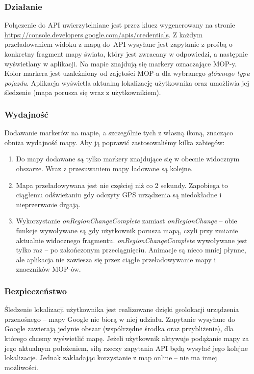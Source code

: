 \subsubsection{Działanie}
Połączenie do API uwierzytelniane jest przez klucz wygenerowany na stronie \url{https://console.developers.google.com/apis/credentials}. Z każdym przeładowaniem widoku z mapą do~API wysyłane jest zapytanie z prośbą o konkretny fragment mapy świata, który jest zwracany w odpowiedzi, a następnie wyświetlany w aplikacji. Na mapie znajdują się markery oznaczające MOP-y. Kolor markera jest uzależniony od zajętości MOP-a dla wybranego \textit{głównego typu pojazdu}. Aplikacja wyświetla aktualną lokalizację użytkownika oraz umożliwia jej śledzenie (mapa porusza się wraz z użytkownikiem). 
\subsubsection{Wydajność}
Dodawanie markerów na mapie, a szczególnie tych z własną ikoną, znacząco obniża wydajność mapy. Aby ją poprawić zastosowaliśmy kilka zabiegów:
\begin{enumerate}
\item Do mapy dodawane są tylko markery znajdujące się w obecnie widocznym obszarze. Wraz z przesuwaniem mapy ładowane są kolejne.
\item Mapa przeładowywana jest nie częściej niż co 2 sekundy. Zapobiega to ciągłemu odświeżaniu gdy odczyty GPS urządzenia są niedokładne i nieprzerwanie drgają.
\item Wykorzystanie \textit{onRegionChangeComplete} zamiast \textit{onRegionChange} -- obie funkcje wywoływane są gdy użytkownik porusza mapą, czyli przy zmianie aktualnie widocznego fragmentu. \textit{onRegionChangeComplete} wywoływane jest tylko raz -- po zakończonym przeciągnięciu. Animacje są nieco mniej płynne, ale aplikacja nie zawiesza się przez ciągłe przeładowywanie mapy i znaczników MOP-ów.
\end{enumerate}
\subsubsection{Bezpieczeństwo}
Śledzenie lokalizacji użytkownika jest realizowane dzięki geolokacji urządzenia przenośnego -- mapy Google nie biorą w niej udziału. Zapytanie wysyłane do Google zawierają jedynie obszar (współrzędne środka oraz przybliżenie), dla którego chcemy wyświetlić mapę. Jeżeli użytkownik aktywuje podążanie mapy za jego aktualnym położeniem, siłą rzeczy zapytania API będą wysyłać jego kolejne lokalizacje. Jednak zakładając korzystanie z map online -- nie ma innej możliwości. 

